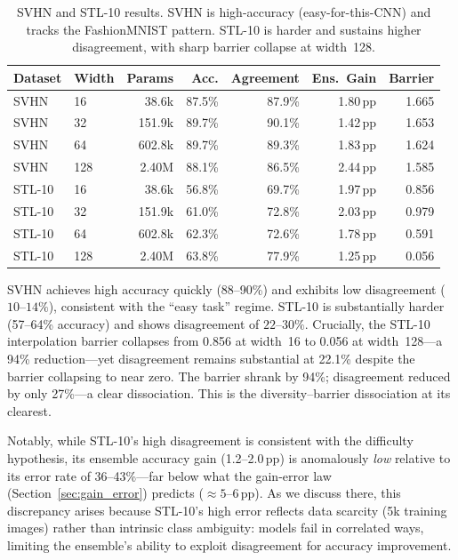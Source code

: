 \documentclass[11pt]{article}
\begin{document}
\begin{table}[h]
\centering
\small
\begin{tabular}{llrrrrr}
\toprule
Dataset & Width & Params & Acc. & Agreement & Ens.\ Gain & Barrier\\
\midrule
SVHN & 16  & 38.6k & 87.5\% & 87.9\% & 1.80\,pp & 1.665\\
SVHN & 32  & 151.9k & 89.7\% & 90.1\% & 1.42\,pp & 1.653\\
SVHN & 64  & 602.8k & 89.7\% & 89.3\% & 1.83\,pp & 1.624\\
SVHN & 128 & 2.40M & 88.1\% & 86.5\% & 2.44\,pp & 1.585\\
\midrule
STL-10 & 16  & 38.6k & 56.8\% & 69.7\% & 1.97\,pp & 0.856\\
STL-10 & 32  & 151.9k & 61.0\% & 72.8\% & 2.03\,pp & 0.979\\
STL-10 & 64  & 602.8k & 62.3\% & 72.6\% & 1.78\,pp & 0.591\\
STL-10 & 128 & 2.40M & 63.8\% & 77.9\% & 1.25\,pp & 0.056\\
\bottomrule
\end{tabular}
\caption{SVHN and STL-10 results. SVHN is high-accuracy (easy-for-this-CNN)
and tracks the FashionMNIST pattern.  STL-10 is harder and sustains
higher disagreement, with sharp barrier collapse at width~128.}
\label{tab:new_datasets}
\end{table}

SVHN achieves high accuracy quickly (88--90\%) and exhibits low
disagreement ($10$--$14\%$), consistent with the ``easy task'' regime.
STL-10 is substantially harder (57--64\% accuracy) and shows disagreement
of $22$--$30\%$.  Crucially, the STL-10 interpolation barrier collapses
from 0.856 at width~16 to 0.056 at width~128—a 94\% reduction—yet
disagreement remains substantial at 22.1\% despite the barrier collapsing to near zero.
The barrier shrank by 94\%; disagreement reduced by only 27\%---a clear dissociation.
This is the diversity--barrier dissociation at its clearest.

Notably, while STL-10's high disagreement is consistent with the difficulty
hypothesis, its ensemble accuracy gain (1.2--2.0\,pp) is anomalously
\emph{low} relative to its error rate of 36--43\%---far below what the
gain-error law (Section~\ref{sec:gain_error}) predicts (${\approx}5$--$6$\,pp).
As we discuss there, this discrepancy arises because STL-10's high error
reflects data scarcity (5k training images) rather than intrinsic class
ambiguity: models fail in correlated ways, limiting the ensemble's
ability to exploit disagreement for accuracy improvement.
\end{document}
